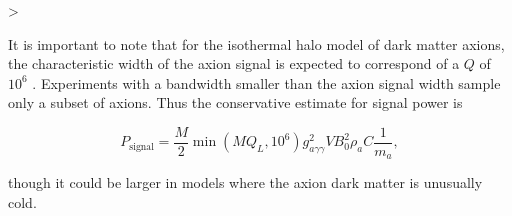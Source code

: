 >\documentclass[aps,prl,twocolumn,groupedaddress]{revtex4-1}
\begin{document}

It is important to note that for the isothermal halo model of dark matter axions,  the characteristic width of the axion signal is expected to correspond of a $Q$ of $10^6$ \cite{Cavity_idea}.   Experiments with a bandwidth smaller than the axion signal width sample only a subset of axions.  Thus the conservative estimate for signal power is

\begin{equation}
\label{eqn:sig}
P_{\mathrm{signal}}=\frac{M}{2}\min\left(MQ_L,10^6\right)g_{a\gamma\gamma}^2VB_0^2\rho_aC\frac{1}{m_a},
\end{equation}

though it could be larger in models where the axion dark matter is unusually cold.


                                
%
%
%
%
%
%
%
%
%
%
\end{document}
